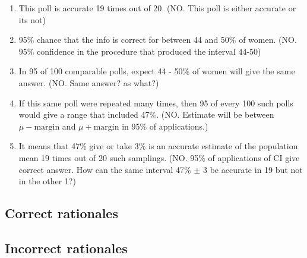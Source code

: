 \documentclass[letterpaper,9pt,twoside,printwatermark=false]{pinp}
\providecommand{\tightlist}{%
  \setlength{\itemsep}{0pt}\setlength{\parskip}{0pt}}
\begin{document}
\begin{enumerate}
\def\labelenumi{\alph{enumi}.}
\tightlist
\item
  This poll is accurate 19 times out of 20. (NO. This poll is either
  accurate or its not)
\item
  95\% chance that the info is correct for between 44 and 50\% of women.
  (NO. 95\% confidence in the procedure that produced the interval
  44-50)
\item
  In 95 of 100 comparable polls, expect 44 - 50\% of women will give the
  same answer. (NO. Same answer? as what?)
\item
  If this same poll were repeated many times, then 95 of every 100 such
  polls would give a range that included 47\%. (NO. Estimate will be
  between \(\mu - \textrm{margin}\) and \(\mu + \textrm{margin}\) in
  95\% of applications.)
\item
  It means that 47\% give or take 3\% is an accurate estimate of the
  population mean 19 times out of 20 such samplings. (NO. 95\% of
  applications of CI give correct answer. How can the same interval 47\%
  \(\pm\) 3 be accurate in 19 but not in the other 1?)
\end{enumerate}

\subsection{Correct rationales}\label{correct-rationales-5}

\subsection{Incorrect rationales}\label{incorrect-rationales-5}
\end{document}
